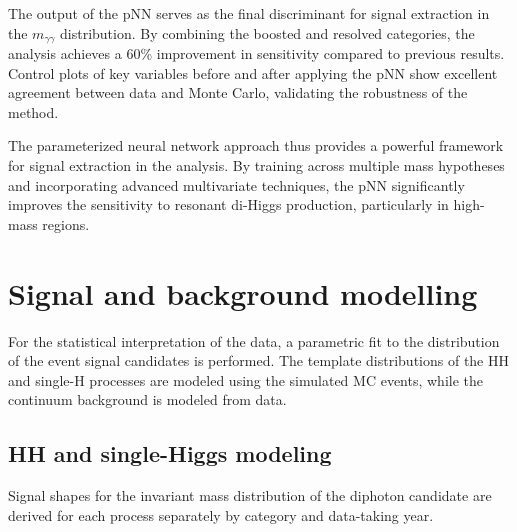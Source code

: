The output of the pNN serves as the final discriminant for signal extraction in the \(m_{\gamma\gamma}\) distribution. By combining the boosted and resolved categories, the analysis achieves a 60\% improvement in sensitivity compared to previous results. Control plots of key variables before and after applying the pNN show excellent agreement between data and Monte Carlo, validating the robustness of the method.

The parameterized neural network approach thus provides a powerful framework for signal extraction in the \HHWW analysis. By training across multiple mass hypotheses and incorporating advanced multivariate techniques, the pNN significantly improves the sensitivity to resonant di-Higgs production, particularly in high-mass regions.

\section{Signal and background modelling}
\label{sec:AnalyticFitting}

For the statistical interpretation of the data, a parametric fit to the \mgg distribution of the event signal candidates is performed.
The template \mgg distributions of the HH and single-H processes are modeled using the simulated MC events, while the continuum background is modeled from data.

\subsection{HH and single-Higgs modeling}
\label{sec:SignalFitting}
Signal shapes for the invariant mass distribution of the diphoton candidate are derived for each process separately by category and data-taking year.

